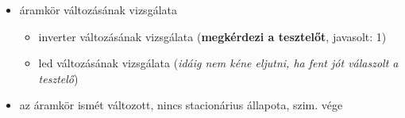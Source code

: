 {\begin{itemize}
\begin{itemize}
\begin{itemize}
\begin{itemize}
	\end{itemize}
\end{itemize}
\item áramkör változásának vizsgálata
\begin{itemize}
\setlength{\itemsep}{0cm}%
\setlength{\parskip}{0cm}%
\setlength{\itemindent}{-50pt}%
	\item inverter változásának vizsgálata (\textbf{megkérdezi a tesztelőt}, javasolt: 1)
	\item led változásának vizsgálata (\textit{idáig nem kéne eljutni, ha fent jót válaszolt a tesztelő})
\end{itemize}
\item az áramkör ismét változott, nincs stacionárius állapota, szim. vége
\end{itemize}
\end{itemize}
\vspace{-15pt}}

\newpage

